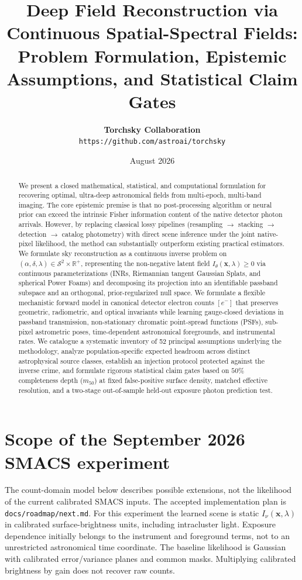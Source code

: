\documentclass[11pt,a4paper]{article}
\title{\textbf{Deep Field Reconstruction via Continuous Spatial-Spectral Fields:\\
Problem Formulation, Epistemic Assumptions, and Statistical Claim Gates}}
\author{
    \textbf{Torchsky Collaboration} \\
    \texttt{https://github.com/astroai/torchsky}
}
\date{August 2026}
\begin{document}
\maketitle

\begin{abstract}
We present a closed mathematical, statistical, and computational formulation for recovering optimal, ultra-deep astronomical fields from multi-epoch, multi-band imaging. The core epistemic premise is that no post-processing algorithm or neural prior can exceed the intrinsic Fisher information content of the native detector photon arrivals. However, by replacing classical lossy pipelines (resampling $\to$ stacking $\to$ detection $\to$ catalog photometry) with direct scene inference under the joint native-pixel likelihood, the method can substantially outperform existing practical estimators. We formulate sky reconstruction as a continuous inverse problem on $(\alpha, \delta, \lambda) \in \mathcal{S}^2 \times \mathbb{R}^+$, representing the non-negative latent field $I_\theta(\boldsymbol{x}, \lambda) \ge 0$ via continuous parameterizations (INRs, Riemannian tangent Gaussian Splats, and spherical Power Foams) and decomposing its projection into an identifiable passband subspace and an orthogonal, prior-regularized null space. We formulate a flexible mechanistic forward model in canonical detector electron counts $[e^-]$ that preserves geometric, radiometric, and optical invariants while learning gauge-closed deviations in passband transmission, non-stationary chromatic point-spread functions (PSFs), sub-pixel astrometric poses, time-dependent astronomical foregrounds, and instrumental rates. We catalogue a systematic inventory of 52 principal assumptions underlying the methodology, analyze population-specific expected headroom across distinct astrophysical source classes, establish an injection protocol protected against the inverse crime, and formulate rigorous statistical claim gates based on $50\%$ completeness depth ($m_{50}$) at fixed false-positive surface density, matched effective resolution, and a two-stage out-of-sample held-out exposure photon prediction test.
\end{abstract}

\section*{Scope of the September 2026 SMACS experiment}
The count-domain model below describes possible extensions, not the likelihood
of the current calibrated SMACS inputs. The accepted implementation plan is
\texttt{docs/roadmap/next.md}. For this experiment the learned scene is static
$I_\nu(\boldsymbol{x},\lambda)$ in calibrated surface-brightness units, including
intracluster light. Exposure dependence initially belongs to the instrument and
foreground terms, not to an unrestricted astronomical time coordinate. The
baseline likelihood is Gaussian with calibrated error/variance planes and common
masks. Multiplying calibrated brightness by gain does not recover raw counts.
\end{document}
